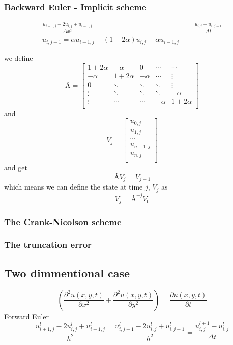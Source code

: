 \documentclass[10pt,a4paper]{article}
\begin{document}
\subsubsection{Backward Euler - Implicit scheme}
\begin{align}
\frac{u_{i+1,j} - 2u_{i,j}+u_{i-1,j}}{\Delta x^2} &= \frac{u_{i,j} - u_{i,j-1}}{\Delta t} \\
u_{i,j-1} = \alpha u_{i+1,j} + (1 - 2\alpha )u_{i,j} + \alpha u_{i-1,j}
\end{align}

we define
\[
Â = \begin{bmatrix}
1+2\alpha & -\alpha & 0 & \cdots & \cdots \\
-\alpha & 1+2\alpha & -\alpha & \cdots & \vdots \\
0 & \ddots & \ddots & \ddots & \vdots \\
\vdots & \ddots & \ddots & \ddots & -\alpha \\
\vdots & \cdots & \cdots & -\alpha & 1+2\alpha \\
\end{bmatrix}
\]
and
\[ V_j = \begin{bmatrix}
u_{0,j}\\
u_{1,j}\\
\cdots\\
u_{n-1,j}\\
u_{n,j}\\
\end{bmatrix}
\]
and get
\begin{equation}
ÂV_j = V_{j-1}
\end{equation}
which means we can define the state at time $j$, $V_j$ as
\begin{equation}
V_j = Â^{-j}V_0
\end{equation}


\subsubsection{The Crank-Nicolson scheme}


\subsubsection{The truncation error}


\subsection{Two dimmentional case}
\begin{equation}
\left(\frac{\partial^2 u(x,y,t)}{\partial x^2} + \frac{\partial^2 u(x,y,t)}{\partial y^2}\right) = \frac{\partial u(x,y,t)}{\partial t}
\end{equation}
Forward Euler
\begin{equation}
\frac{u_{i+1,j}^l - 2u_{i,j}^l + u_{i-1,j}^l}{h^2} + \frac{u_{i,j+1}^l - 2u_{i,j}^l + u_{i,j-1}^l}{h^2} = \frac{u_{i,j}^{l+1} - u_{i,j}^l}{\Delta t}
\end{equation}
\end{document}
